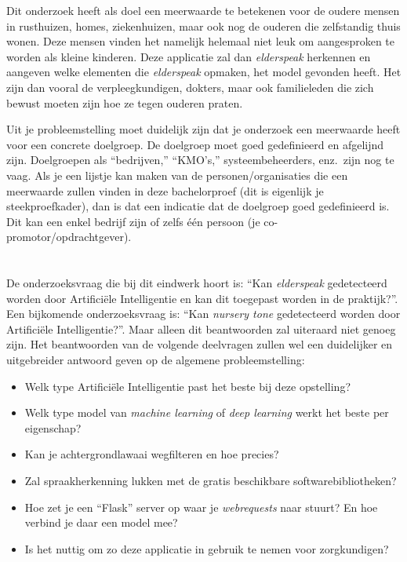 Dit onderzoek heeft als doel een meerwaarde te betekenen voor de oudere mensen in rusthuizen, homes, ziekenhuizen, maar ook nog de ouderen die zelfstandig thuis wonen. Deze mensen vinden het namelijk helemaal niet leuk om aangesproken te worden als kleine kinderen. Deze applicatie zal dan \textit{elderspeak} herkennen en aangeven welke elementen die \textit{elderspeak} opmaken, het model gevonden heeft. Het zijn dan vooral de verpleegkundigen, dokters, maar ook familieleden die zich bewust moeten zijn hoe ze tegen ouderen praten.

\color{blue}
Uit je probleemstelling moet duidelijk zijn dat je onderzoek een meerwaarde heeft voor een concrete doelgroep. De doelgroep moet goed gedefinieerd en afgelijnd zijn. Doelgroepen als ``bedrijven,'' ``KMO's,'' systeembeheerders, enz.~zijn nog te vaag. Als je een lijstje kan maken van de personen/organisaties die een meerwaarde zullen vinden in deze bachelorproef (dit is eigenlijk je steekproefkader), dan is dat een indicatie dat de doelgroep goed gedefinieerd is. Dit kan een enkel bedrijf zijn of zelfs één persoon (je co-promotor/opdrachtgever).

\color{black}

\section{}
\label{sec:onderzoeksvraag}

De onderzoeksvraag die bij dit eindwerk hoort is: ``Kan \textit{elderspeak} gedetecteerd worden door Artificiële Intelligentie en kan dit toegepast worden in de praktijk?''. Een bijkomende onderzoeksvraag is: ``Kan \textit{nursery tone} gedetecteerd worden door Artificiële Intelligentie?''. Maar alleen dit beantwoorden zal uiteraard niet genoeg zijn. Het beantwoorden van de volgende deelvragen zullen wel een duidelijker en uitgebreider antwoord geven op de algemene probleemstelling:
\begin{itemize}
    \item Welk type Artificiële Intelligentie past het beste bij deze opstelling?
    \item Welk type model van \textit{machine learning} of \textit{deep learning} werkt het beste per eigenschap?
    \item Kan je achtergrondlawaai wegfilteren en hoe precies?
    \item Zal spraakherkenning lukken met de gratis beschikbare softwarebibliotheken?
    \item Hoe zet je een ``Flask'' server op waar je \textit{webrequests} naar stuurt? En hoe verbind je daar een model mee?
    \item Is het nuttig om zo deze applicatie in gebruik te nemen voor zorgkundigen?
\end{itemize}

